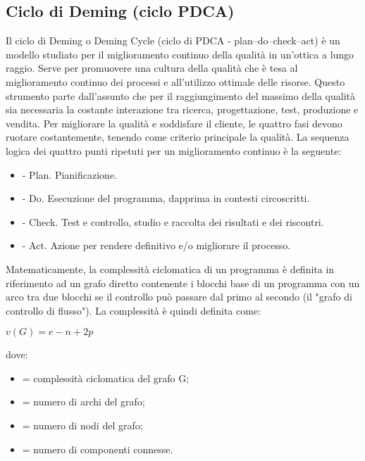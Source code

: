 \subsection{Ciclo di Deming (ciclo PDCA)} %

Il ciclo di Deming o Deming Cycle (ciclo di PDCA - plan–do–check–act) è un modello studiato per il miglioramento continuo della qualità in un'ottica a lungo raggio. Serve per promuovere una cultura della qualità che è tesa al miglioramento continuo dei processi e all'utilizzo ottimale delle risorse. Questo strumento parte dall'assunto che per il raggiungimento del massimo della qualità sia necessaria la costante interazione tra ricerca, progettazione, test, produzione e vendita. Per migliorare la qualità e soddisfare il cliente, le quattro fasi devono ruotare costantemente, tenendo come criterio principale la qualità.
La sequenza logica dei quattro punti ripetuti per un miglioramento continuo è la seguente:
\begin{itemize}
	\item {} - Plan. Pianificazione.
	\item {} - Do. Esecuzione del programma, dapprima in contesti circoscritti.
	\item {} - Check. Test e controllo, studio e raccolta dei risultati e dei riscontri.
	\item {} - Act. Azione per rendere definitivo e/o migliorare il processo.
\end{itemize}


Matematicamente, la complessità ciclomatica di un programma è definita in riferimento ad un grafo diretto contenente i blocchi base di un programma con un arco tra due blocchi se il controllo può passare dal primo al secondo (il "grafo di controllo di flusso"). La complessità è quindi definita come:

\begin{math}
v(G)=e-n+2p
\end{math}

dove:
\begin{itemize}
\item {} = complessità ciclomatica del grafo G;
\item {} = numero di archi del grafo;
\item {} = numero di nodi del grafo;
\item {} = numero di componenti connesse.
\end{itemize}
